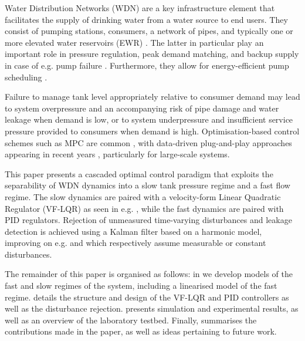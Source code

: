 
Water Distribution Networks (WDN) are a key infrastructure element that facilitates the supply of drinking water from a water source to end users. They consist of pumping stations, consumers, a network of pipes, and typically one or more elevated water reservoirs (EWR) \cite{Swamee2008}. The latter in particular play an important role in pressure regulation, peak demand matching, and backup supply in case of e.g. pump failure \cite{Creaco2019}. Furthermore, they allow for energy-efficient pump scheduling \cite{Rathore1030,Bello2019}.  

Failure to manage tank level appropriately relative to consumer demand may lead to system overpressure and an accompanying risk of pipe damage and water leakage when demand is low, or to system underpressure and insufficient service pressure provided to consumers when demand is high. Optimisation-based control schemes such as MPC are common \cite{OcampoMartinez2013,Kallesoe2017}, with data-driven plug-and-play approaches appearing in recent years \cite{Val2020}, particularly for large-scale systems.  

This paper presents a cascaded optimal control paradigm that exploits the separability of WDN dynamics into a slow tank pressure regime and a fast flow regime. The slow dynamics are paired with a velocity-form Linear Quadratic Regulator (VF-LQR) as seen in e.g. \cite{Pannocchia2015a}, while the fast dynamics are paired with PID regulators. Rejection of unmeasured time-varying disturbances and leakage detection is achieved using a Kalman filter based on a harmonic model, improving on e.g. \cite{OcampoMartinez2013} and \cite{Val2020} which respectively assume measurable or constant disturbances.

The remainder of this paper is organised as follows: in  we develop models of the fast and slow regimes of the system, including a linearised model of the fast regime.  details the structure and design of the VF-LQR and PID controllers as well as the disturbance rejection.  presents simulation and experimental results, as well as an overview of the laboratory testbed. Finally,  summarises the contributions made in the paper, as well as ideas pertaining to future work.